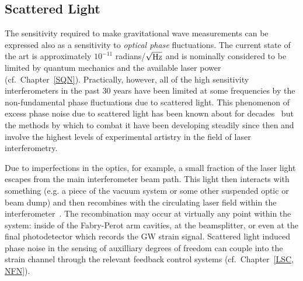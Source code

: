 %


\subsection{Scattered Light}
\label{s:IDC:scatter}
The sensitivity required to make gravitational wave measurements can be expressed also
as a sensitivity to \textit{optical phase} fluctuations. The current state of the art
is approximately $10^{-11}$ radians/$\sqrt{\rm Hz}$ and is nominally considered to be limited
by quantum mechanics and the available laser power (cf.~Chapter~\ref{SQN}). Practically, however,
all of the high sensitivity interferometers in the past 30 years have been limited
at some frequencies by the non-fundamental phase fluctuations due to scattered light.
This phenomenon of excess phase
noise due to scattered light has been known about for decades~\cite{Schilling:1981}
but the methods by which to combat it have been developing steadily since then and
involve the highest levels of experimental artistry in the field of laser interferometry.

Due to imperfections in the optics, for example, a small fraction of the laser light escapes from
the main interferometer beam path. This light then interacts with something (e.g. a piece of the
vacuum system or some other suspended optic or beam dump) and then recombines with the
circulating laser field within the
interferometer~\cite{Kip:Scatter95, Kip:scatter1989, Sam:Scatter2012,
Stefano:Scatter, vinet1997scattered, fritschel1998high}.
The recombination may occur at virtually any point within the system: inside of the
Fabry-Perot arm cavities, at the beamsplitter, or even at the final photodetector which
records the GW strain signal. Scattered light induced phase noise in the sensing
of auxilliary degrees of freedom can couple into the strain channel through the
relevant feedback control systems (cf.~Chapter~\ref{LSC, NFN}).

